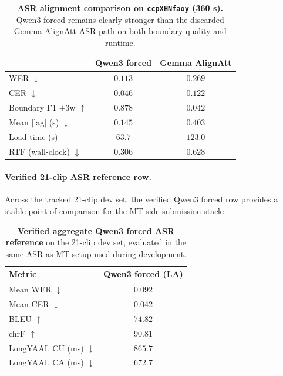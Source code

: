 \documentclass[11pt]{article}
\begin{document}
\begin{table}[t]
\centering
\small
\setlength{\tabcolsep}{4pt}
\begin{tabular}{lcc}
\toprule
 & Qwen3 forced & Gemma AlignAtt \\
\midrule
WER $\downarrow$                 & $0.113$ & $0.269$ \\
CER $\downarrow$                 & $0.046$ & $0.122$ \\
Boundary F1 $\pm$3w $\uparrow$   & $0.878$ & $0.042$ \\
Mean $|$lag$|$ (s) $\downarrow$  & $0.145$ & $0.403$ \\
Load time (s)                    & $63.7$  & $123.0$ \\
RTF (wall-clock) $\downarrow$    & $0.306$ & $0.628$ \\
\bottomrule
\end{tabular}
\caption{\textbf{ASR alignment comparison on \texttt{ccpXHNfaoy} (360 s).}
Qwen3 forced remains clearly stronger than the discarded Gemma AlignAtt ASR
path on both boundary quality and runtime.}
\label{tab:asr-compare}
\end{table}

\paragraph{Verified 21-clip ASR reference row.}
Across the tracked 21-clip dev set, the verified Qwen3 forced row provides a
stable point of comparison for the MT-side submission stack:

\begin{table}[t]
\centering
\small
\begin{tabular}{lc}
\toprule
Metric & Qwen3 forced (LA) \\
\midrule
Mean WER $\downarrow$         & $0.092$ \\
Mean CER $\downarrow$         & $0.042$ \\
BLEU $\uparrow$               & $74.82$ \\
chrF $\uparrow$               & $90.81$ \\
LongYAAL CU (ms) $\downarrow$ & $865.7$ \\
LongYAAL CA (ms) $\downarrow$ & $672.7$ \\
\bottomrule
\end{tabular}
\caption{\textbf{Verified aggregate Qwen3 forced ASR reference} on the 21-clip
dev set, evaluated in the same ASR-as-MT setup used during development.}
\label{tab:asr-21clip}
\end{table}
\end{document}
